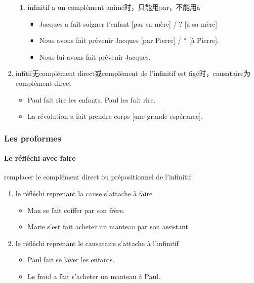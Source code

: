 \documentclass[UTF8]{report}
\begin{document}
\begin{enumerate}
\begin{enumerate}
        \item infinitif a un complément animé时，只能用par，不能用à
        \begin{itemize}
            \item Jacques a fait soigner l’enfant [par sa mère] / ? [à sa mère]
            \item Nous avons fait prévenir Jacques [par Pierre] / * [à Pierre].
            \item Nous lui avons fait prévenir Jacques.
        \end{itemize}
    \end{enumerate}
    \item infitif无complément direct或complément de l’infinitif est figé时，causataire为complément direct
    \begin{itemize}
        \item Paul fait rire les enfants. Paul les fait rire.
        \item La révolution a fait prendre corps [une grande espérance].
    \end{itemize}
\end{enumerate}

\subsubsection{Les proformes}
\paragraph{Le réfléchi avec faire}
remplacer le complément direct ou prépositionnel de l’infinitif.
\begin{enumerate}
    \item le réfléchi reprenant la cause s’attache à faire
    \begin{itemize}
        \item Max se fait coiffer par son frère.
        \item Marie s’est fait acheter un manteau par son assistant.
    \end{itemize}
    \item le réfléchi reprenant le causataire s’attache à l’infinitif
    \begin{itemize}
        \item Paul fait se laver les enfants.
        \item Le froid a fait s’acheter un manteau à Paul.
    \end{itemize}
\end{enumerate}
\end{document}

